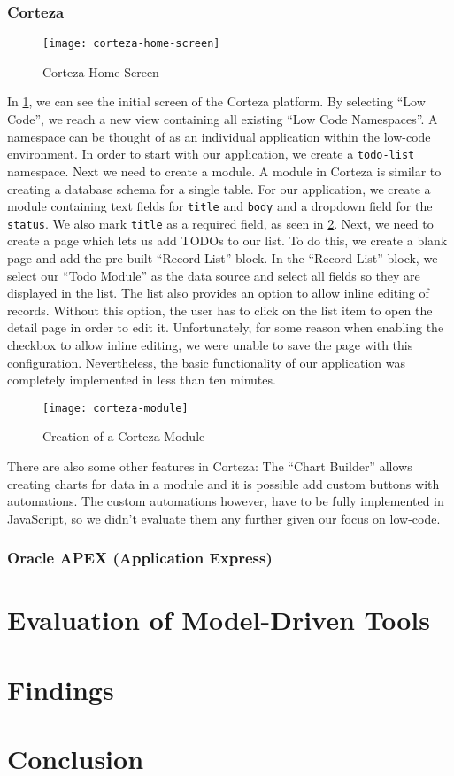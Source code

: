 \documentclass[runningheads]{llncs}
\begin{document}
\subsubsection{Corteza}

\begin{figure}
  \centering
  \texttt{[image: corteza-home-screen]}
  \caption{Corteza Home Screen}
  \label{fig:corteza_home_screen}
\end{figure}

In \cref{fig:corteza_home_screen}, we can see the initial screen of the Corteza platform. By selecting “Low Code”, we reach a new view containing all existing “Low Code Namespaces”. A namespace can be thought of as an individual application within the low-code environment. In order to start with our application, we create a \texttt{todo-list} namespace. Next we need to create a module. A module in Corteza is similar to creating a database schema for a single table. For our application, we create a module containing text fields for \texttt{title} and \texttt{body} and a dropdown field for the \texttt{status}. We also mark \texttt{title} as a required field, as seen in \cref{fig:corteza_module}. Next, we need to create a page which lets us add TODOs to our list. To do this, we create a blank page and add the pre-built “Record List” block. In the “Record List” block, we select our “Todo Module” as the data source and select all fields so they are displayed in the list. The list also provides an option to allow inline editing of records. Without this option, the user has to click on the list item to open the detail page in order to edit it. Unfortunately, for some reason when enabling the checkbox to allow inline editing, we were unable to save the page with this configuration. Nevertheless, the basic functionality of our application was completely implemented in less than ten minutes.

\begin{figure}
  \centering
  \texttt{[image: corteza-module]}
  \caption{Creation of a Corteza Module}
  \label{fig:corteza_module}
\end{figure}

There are also some other features in Corteza: The “Chart Builder” allows creating charts for data in a module and it is possible add custom buttons with automations. The custom automations however, have to be fully implemented in JavaScript, so we didn't evaluate them any further given our focus on low-code.

\subsubsection{Oracle APEX (Application Express)}

\section{Evaluation of Model-Driven Tools}
\label{sec:evaluation_of_model_driven_tools}

\section{Findings}
\label{sec:findings}

\section{Conclusion}
\label{sec:conclusion}

\newpage
\printbibliography
\end{document}
